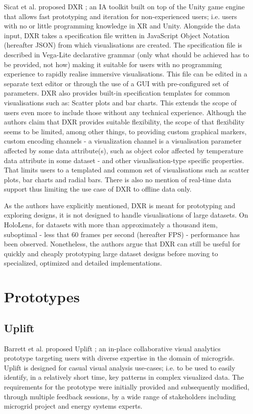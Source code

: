 \documentclass{vgtc}                          %
\begin{document}
Sicat et al. proposed DXR \cite{dxr_toolkit}; an IA toolkit built on top of the Unity game engine
that allows fast prototyping and iteration for non-experienced users; i.e.
users with no or little programming knowledge in XR and Unity.
Alongside the data input, DXR takes a specification file written in JavaScript
Object Notation (hereafter JSON) from which visualisations are created.
The specification file is described in Vega-Lite declarative grammar \cite{vega_lite}
(only what should be achieved has to be provided, not how) making it suitable
for users with no programming experience to rapidly realise immersive
visualisations. This file can be edited in a separate text editor or through
the use of a GUI with pre-configured set of parameters. DXR also provides
built-in specification templates for common visualisations such as: Scatter
plots and bar charts. This extends the scope of users even more to include
those without any technical experience. Although the authors claim that DXR
provides suitable flexibility, the scope of that flexibility seems to be
limited, among other things, to providing custom graphical markers, custom
encoding channels - a visualization channel is a visualisation parameter affected by some
data attribute(s), such as object color affected by temperature data attribute in some dataset -
and other visualisation-type specific properties. That limits users to a
templated and common set of visualisations such as scatter plots, bar charts
and radial bars. There is also no mention of real-time data support thus
limiting the use case of DXR to offline data only.

\smallskip

\noindent As the authors have explicitly mentioned, DXR is meant for
prototyping and exploring designs, it is not designed to handle visualisations
of large datasets. On HoloLens, for datasets with more than approximately
a thousand item, suboptimal - less that 60 frames per second (hereafter FPS) -
performance has been observed. Nonetheless, the authors argue that DXR can still
be useful for quickly and cheaply prototyping large dataset designs before
moving to specialized, optimized and detailed implementations.

\section{Prototypes}
\subsection{Uplift}
Barrett et al. proposed Uplift \cite{uplift_prototype}; an in-place
collaborative visual analytics prototype targeting users with diverse
expertise in the domain of microgrids. Uplift is designed for casual visual
analysis use-cases; i.e. to be used to easily identify, in a relatively short
time, key patterns in complex visualized data. The requirements for the
prototype were initially provided and subsequently modified, through multiple
feedback sessions, by a wide range of stakeholders including microgrid project
and energy systems experts.
\end{document}

